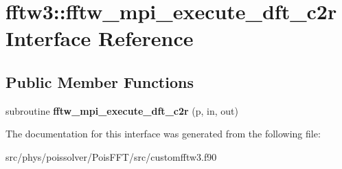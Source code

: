 \hypertarget{interfacefftw3_1_1fftw__mpi__execute__dft__c2r}{}\section{fftw3\+:\+:fftw\+\_\+mpi\+\_\+execute\+\_\+dft\+\_\+c2r Interface Reference}
\label{interfacefftw3_1_1fftw__mpi__execute__dft__c2r}
\subsection*{Public Member Functions}
\begin{DoxyCompactItemize}
\item 
subroutine {\bfseries fftw\+\_\+mpi\+\_\+execute\+\_\+dft\+\_\+c2r} (p, in, out)\hypertarget{interfacefftw3_1_1fftw__mpi__execute__dft__c2r_a552e15eceffb9bb3eebe625a8266b2bb}{}\label{interfacefftw3_1_1fftw__mpi__execute__dft__c2r_a552e15eceffb9bb3eebe625a8266b2bb}

\end{DoxyCompactItemize}


The documentation for this interface was generated from the following file\+:\begin{DoxyCompactItemize}
\item 
src/phys/poissolver/\+Pois\+F\+F\+T/src/customfftw3.\+f90\end{DoxyCompactItemize}
